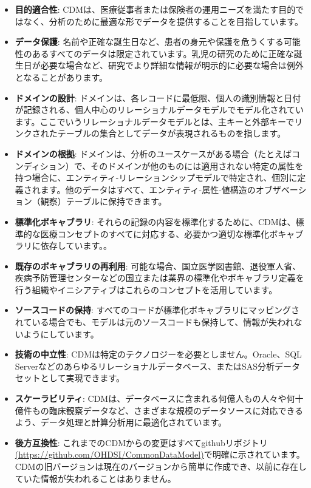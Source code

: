 \documentclass[
  11pt]{book}
\providecommand{\tightlist}{%
  \setlength{\itemsep}{0pt}\setlength{\parskip}{0pt}}
\theoremstyle{definition}
\theoremstyle{definition}
\theoremstyle{definition}
\theoremstyle{definition}
\theoremstyle{remark}
\begin{document}
\begin{itemize}
\tightlist
\item
  \textbf{目的適合性}: CDMは、医療従事者または保険者の運用ニーズを満たす目的ではなく、分析のために最適な形でデータを提供することを目指しています。 
\item
  \textbf{データ保護}: 名前や正確な誕生日など、患者の身元や保護を危うくする可能性のあるすべてのデータは限定されています。乳児の研究のために正確な誕生日が必要な場合など、研究でより詳細な情報が明示的に必要な場合は例外となることがあります。 
\item
  \textbf{ドメインの設計}: ドメインは、各レコードに最低限、個人の識別情報と日付が記録される、個人中心のリレーショナルデータモデルでモデル化されています。ここでいうリレーショナルデータモデルとは、主キーと外部キーでリンクされたテーブルの集合としてデータが表現されるものを指します。
\item
  \textbf{ドメインの根拠}: ドメインは、分析のユースケースがある場合（たとえばコンディション）で、そのドメインが他のものには適用されない特定の属性を持つ場合に、エンティティ-リレーションシップモデルで特定され、個別に定義されます。他のデータはすべて、エンティティ-属性-値構造のオブザベーション（観察）テーブルに保持できます。 
\item
  \textbf{標準化ボキャブラリ}: それらの記録の内容を標準化するために、CDMは、標準的な医療コンセプトのすべてに対応する、必要かつ適切な標準化ボキャブラリに依存しています。。
\item
  \textbf{既存のボキャブラリの再利用}: 可能な場合、国立医学図書館、退役軍人省、疾病予防管理センターなどの国立または業界の標準化やボキャブラリ定義を行う組織やイニシアティブはこれらのコンセプトを活用しています。
\item
  \textbf{ソースコードの保持}: すべてのコードが標準化ボキャブラリにマッピングされている場合でも、モデルは元のソースコードも保持して、情報が失われないようにしています。  
\item
  \textbf{技術の中立性}: CDMは特定のテクノロジーを必要としません。Oracle、SQL Serverなどのあらゆるリレーショナルデータベース、またはSAS分析データセットとして実現できます。 
\item
  \textbf{スケーラビリティ}: CDMは、データベースに含まれる何億人もの人々や何十億件もの臨床観察データなど、さまざまな規模のデータソースに対応できるよう、データ処理と計算分析用に最適化されています。 
\item
  \textbf{後方互換性}: これまでのCDMからの変更はすべてgithubリポジトリ\href{https://github.com/OHDSI/CommonDataModel}{(https://github.com/OHDSI/CommonDataModel)}で明確に示されています。CDMの旧バージョンは現在のバージョンから簡単に作成でき、以前に存在していた情報が失われることはありません。 
\end{itemize}
\end{document}
